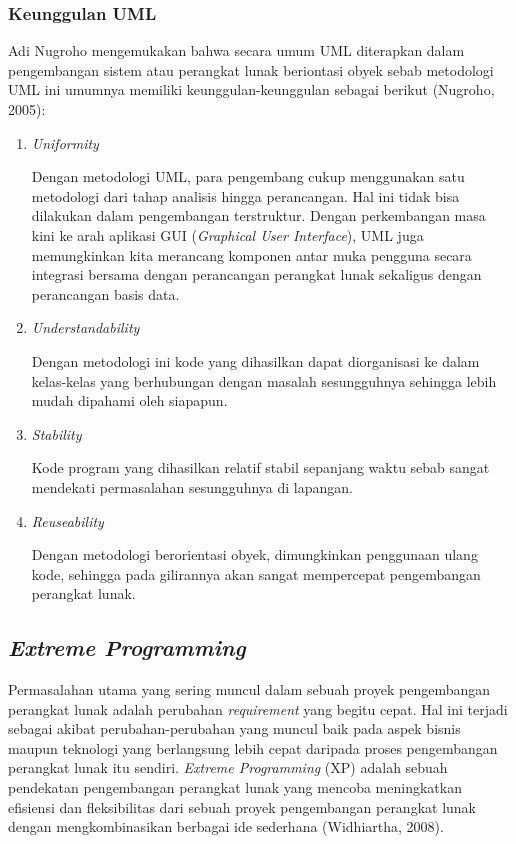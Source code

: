     \subsubsection{Keunggulan UML}
    Adi Nugroho mengemukakan bahwa secara umum UML diterapkan dalam pengembangan sistem atau perangkat lunak beriontasi obyek sebab metodologi UML ini umumnya memiliki keunggulan-keunggulan sebagai berikut (Nugroho, 2005):
    \newline
    \begin{enumerate}
      \itemsep0em
      \item \emph{Uniformity}
      
      Dengan metodologi UML, para pengembang cukup menggunakan satu metodologi dari tahap analisis hingga perancangan. Hal ini tidak bisa dilakukan dalam pengembangan terstruktur. Dengan perkembangan masa kini ke arah aplikasi GUI (\emph{Graphical User Interface}), UML juga memungkinkan kita merancang komponen antar muka pengguna secara integrasi bersama dengan perancangan perangkat lunak sekaligus dengan perancangan basis data.
      \item \emph{Understandability}
      
      Dengan metodologi ini kode yang dihasilkan dapat diorganisasi ke dalam kelas-kelas yang berhubungan dengan masalah sesungguhnya sehingga lebih mudah dipahami oleh siapapun.
      \item \emph{Stability}
      
      Kode program yang dihasilkan relatif stabil sepanjang waktu sebab sangat mendekati permasalahan sesungguhnya di lapangan.
      \item \emph{Reuseability}
      
      Dengan metodologi berorientasi obyek, dimungkinkan penggunaan ulang kode, sehingga pada gilirannya akan sangat mempercepat pengembangan perangkat lunak.
    \end{enumerate}

  \subsection{\emph{Extreme Programming}}
  Permasalahan utama yang sering muncul dalam sebuah proyek pengembangan perangkat lunak adalah perubahan \emph{requirement} yang begitu cepat. Hal ini terjadi sebagai akibat perubahan-perubahan yang muncul baik pada aspek bisnis maupun teknologi yang berlangsung lebih cepat daripada proses pengembangan perangkat lunak itu sendiri. \emph{Extreme Programming} (XP) adalah sebuah pendekatan pengembangan perangkat lunak yang mencoba meningkatkan efisiensi dan fleksibilitas dari sebuah proyek pengembangan perangkat lunak dengan mengkombinasikan berbagai ide sederhana (Widhiartha, 2008).
  
